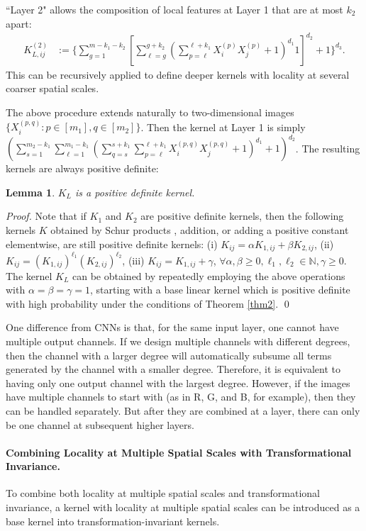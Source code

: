 \documentclass{article}
\theoremstyle{plain}
\newtheorem{lemma}{Lemma}
\theoremstyle{definition}
\theoremstyle{remark}
\begin{document}
``Layer 2" allows the composition of local features at Layer 1 that are at most $k_2$ apart:
\begin{align}
    K_{L, ij}^{(2)} &:= \{\sum_{g=1}^{m-k_1-k_2}[\sum_{\ell=g}^{g+k_2} (\sum_{p=\ell}^{\ell+k_1} X_{i}^{(p)} X_{j}^{(p)} + 1)^{d_1} 1]^{d_2} + 1\}^{d_3}.
\end{align}
This can be recursively applied to define deeper kernels with locality at several coarser spatial scales.

The above procedure extends naturally to two-dimensional images $\{X_{i}^{(p, q)}: p \in [m_1], q \in [m_2]\}$. Then the kernel at Layer 1 is simply $(\sum_{s=1}^{m_2-k_1} \sum_{\ell=1}^{m_1-k_1} (\sum_{q=s}^{s+k_1}\sum_{p=\ell}^{\ell+k_1} X_{i}^{(p, q)} X_{j}^{(p, q)} + 1)^{d_1}+1)^{d_2}$. The resulting kernels are always positive definite:

\begin{lemma}
    $K_{L}$ is a positive definite kernel. 
    \label{lem:local_pd}
\end{lemma}
\textit{Proof.}
Note that if $K_1$ and $K_2$ are positive definite kernels, then the following kernels $K$ obtained by Schur products \cite{schur1911bemerkungen}, addition, or adding a positive constant elementwise, are still positive definite kernels: (i)
$K_{ij} = \alpha K_{1, ij} + \beta K_{2, ij}$, (ii)
$K_{ij} = (K_{1, ij})^{\ell_1} (K_{2, ij})^{\ell_2}$, (iii) 
$K_{ij} = K_{1, ij} + \gamma$, $\forall \alpha,\beta \ge 0, \ell_1, \ell_2 \in \mathbb{N}, \gamma \geq 0$. The kernel $K_L$ can be obtained by repeatedly employing the above operations with $\alpha=\beta=\gamma=1$, starting with a base linear kernel
which is positive definite with high probability under the conditions of Theorem \ref{thm2}.
\qed

One difference from CNNs is that, for the same input layer, one cannot have multiple output channels. If we design multiple channels with different degrees, then the channel with a larger degree will automatically subsume all terms generated by the channel with a smaller degree. Therefore, it is equivalent to having only one output channel with the largest degree. However, if the images have multiple channels to start with (as in R, G, and B, for example), then they can be handled separately. But after they are combined at a layer, there can only be one channel at subsequent higher layers.

\paragraph{Combining Locality at Multiple Spatial Scales with Transformational Invariance.}
To combine both locality at multiple spatial scales and transformational invariance, a kernel with locality at multiple spatial scales can be introduced as a base kernel into transformation-invariant kernels. 
\end{document}
